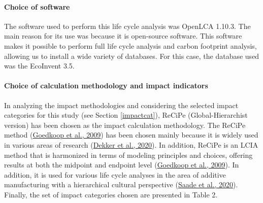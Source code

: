 \documentclass[12pt]{elsarticle} %
\begin{document}
\hypertarget{choice-of-software}{%
\paragraph{Choice of software}\label{choice-of-software}}

The software used to perform this life cycle analysis was OpenLCA 1.10.3.
The main reason for its use was because it is open-source software.
This software makes it possible to perform full life cycle analysis and carbon footprint analysis, allowing us to install a wide variety of databases. For this case, the database used was the EcoInvent 3.5.

\hypertarget{choice-of-calculation-methodology-and-impact-indicators}{%
\paragraph{Choice of calculation methodology and impact indicators}\label{choice-of-calculation-methodology-and-impact-indicators}}

In analyzing the impact methodologies and considering the selected impact categories for this study (see Section \ref{impactcat}), ReCiPe (Global-Hierarchist version) has been chosen as the impact calculation methodology.
The ReCiPe method (\protect\hyperlink{ref-goedkoop2009}{Goedkoop et al., 2009}) has been chosen mainly because it is widely used in various areas of research (\protect\hyperlink{ref-dekker2020}{Dekker et al., 2020}).
In addition, ReCiPe is an LCIA method that is harmonized in terms of modeling principles and choices, offering results at both the midpoint and endpoint level (\protect\hyperlink{ref-goedkoop2009}{Goedkoop et al., 2009}).
In addition, it is used for various life cycle analyses in the area of additive manufacturing with a hierarchical cultural perspective (\protect\hyperlink{ref-Saade2020}{Saade et al., 2020}).
Finally, the set of impact categories chosen are presented in Table 2.
\end{document}
